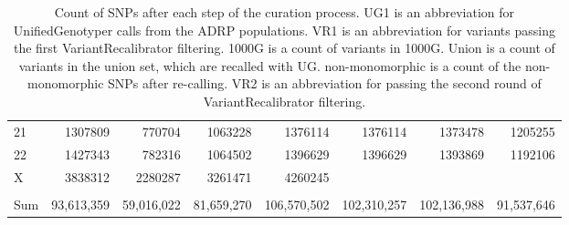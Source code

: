 \begin{table}[htbp]
{\begin{tabular}{l|r|r|r|r|r|r|r}
21 & 1307809 & 770704 & 1063228 & 1376114 & 1376114 & 1373478 & 1205255 \\
22 & 1427343 & 782316 & 1064502 & 1396629 & 1396629 & 1393869 & 1192106 \\
X & 3838312 & 2280287 & 3261471 & 4260245 &  &  &  \\
 &  &  &  &  &  &  &  \\
\hline
Sum & 93,613,359 & 59,016,022 & 81,659,270 & 106,570,502 & 102,310,257 & 102,136,988 & 91,537,646 \\
\end{tabular}
}
\caption{Count of SNPs after each step of the curation process. UG1 is an abbreviation for UnifiedGenotyper calls from the ADRP populations. VR1 is an abbreviation for variants passing the first VariantRecalibrator filtering. 1000G is a count of variants in 1000G. Union is a count of variants in the union set, which are recalled with UG. non-monomorphic is a count of the non-monomorphic SNPs after re-calling. VR2 is an abbreviation for passing the second round of VariantRecalibrator filtering.}
\label{tab:SNPcount}
\end{table}